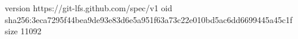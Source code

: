 version https://git-lfs.github.com/spec/v1
oid sha256:3eca7295f44bea9de93e83d6e5a951f63a73c22e010bd5ac6dd6699445a45c1f
size 11092
